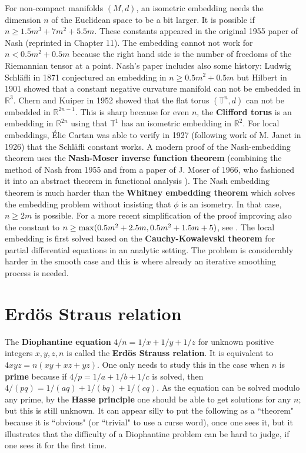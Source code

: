 \documentclass[12pt]{amsart}
\begin{document}
For non-compact manifolds $(M,d)$, an isometric embedding needs the dimension $n$ of the Euclidean space
to be a bit larger. It is possible if $n \geq 1.5 m^3 + 7m^2 + 5.5 m$.  These constants
appeared in the original 1955 paper of Nash
(reprinted in \cite{EssentialNash} Chapter 11). The embedding cannot not work for $n<0.5 m^2 + 0.5m$
because the right hand side is the number of freedoms of the Riemannian tensor at a point.
Nash's paper includes also some history: Ludwig Schl\"afli in 1871 conjectured 
an embedding in $n \geq 0.5 m^2+0.5m$ but Hilbert in 1901 showed that a constant 
negative curvature manifold can not be embedded in $\mathbb{R}^3$.
Chern and Kuiper in 1952 showed that the flat torus $(\mathbb{T}^n,d)$ can not be embedded
in $\mathbb{R}^{2n-1}$. This is sharp because for even $n$, the {\bf Clifford torus}
is an embedding in $\mathbb{R}^{2n}$ using that
$\mathbb{T}^1$ has an isometric embedding in $\mathbb{R}^{2}$.
For local embeddings, \'Elie Cartan was able to verify in 1927
(following work of M. Janet in 1926) that the Schl\"afli constant
works. A modern proof of the Nash-embedding theorem uses the
{\bf Nash-Moser inverse function theorem} (combining the method of Nash from 1955 and from 
a paper of J. Moser of 1966, who fashioned it into an abstract theorem in  
functional analysis \cite{Hamilton1982,KrantzParksImplicitFunction}).
The Nash embedding theorem is much harder than the
{\bf Whitney embedding theorem} which solves the embedding problem 
without insisting that $\phi$ is an isometry. In that case, $n \geq 2m$ is possible.  
For a more recent simplification of the proof improving also the constant
to $n \geq {\rm max}(0.5 m^2+2.5m,0.5 m^2+1.5m +5)$, see \cite{Guenther1991}. 
The local embedding is first solved based on the {\bf Cauchy-Kowalevski theorem} for
partial differential equations in an analytic setting. The problem is considerably harder 
in the smooth case and this is where already an iterative smoothing process is needed.

\section{Erd\"os Straus relation}

The {\bf Diophantine equation} $4/n = 1/x+1/y+1/z$ for unknown positive integers $x,y,z,n$
is called the {\bf Erd\"os Strauss relation}. It is equivalent to $4x y z = n (xy + xz + yz)$.
One only needs to study this in the case when $n$ is {\bf prime} because if $4/p = 1/a+1/b+1/c$ is
solved, then $4/(pq) = 1/(aq) + 1/(bq)+ 1/(cq)$.
As the equation can be solved modulo any prime, by the {\bf Hasse principle} one should
be able to get solutions for any $n$; but this is still unknown. It can appear silly to put the
following as a ``theorem" because it is ``obvious" (or ``trivial" to use a curse word), 
once one sees it, but it illustrates that the difficulty of a Diophantine problem can be hard to 
judge, if one sees it for the first time.
\end{document}
